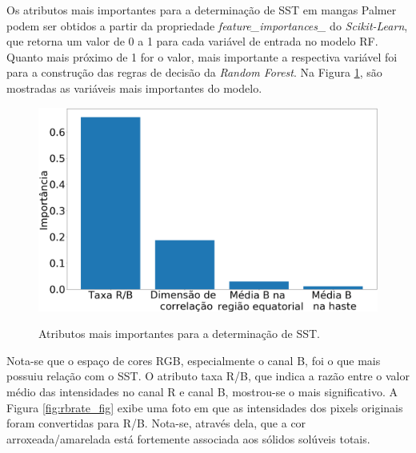 Os atributos mais importantes para a determinação de SST em mangas Palmer podem ser obtidos a partir da propriedade \textit{feature\_importances\_} do \textit{Scikit-Learn}, que retorna um valor de 0 a 1 para cada variável de entrada no modelo RF. Quanto mais próximo de 1 for o valor, mais importante a respectiva variável foi para a construção das regras de decisão da \textit{Random Forest}. Na Figura \ref{fig:feat_import}, são mostradas as variáveis mais importantes do modelo.

\begin{figure}[H]
\centering
	\caption{Atributos mais importantes para a determinação de SST.}
	\includegraphics[scale=0.18]{img/feat_import_sst_palmer.png}
	\label{fig:feat_import}
\end{figure}

Nota-se que o espaço de cores RGB, especialmente o canal B, foi o que mais possuiu relação com o SST. O atributo taxa R/B, que indica a razão entre o valor médio das intensidades no canal R e canal B, mostrou-se o mais significativo. A Figura \ref{fig:rbrate_fig} exibe uma foto em que as intensidades dos pixels originais foram convertidas para R/B. Nota-se, através dela, que a cor arroxeada/amarelada está fortemente associada aos sólidos solúveis totais.

